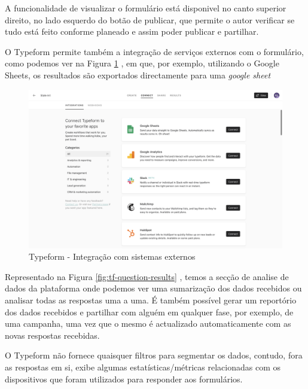 \newpage

A funcionalidade de visualizar o formulário está disponivel no canto superior direito, no lado esquerdo do botão de publicar, que permite o autor verificar se tudo está feito conforme planeado e assim poder publicar e partilhar.

O Typeform permite também a integração de serviços externos com o formulário, como podemos ver na Figura \ref{fig:tf-question-integration} , em que, por exemplo, utilizando o Google Sheets\cite{googlesheets}, os resultados são exportados directamente para uma \textit{google sheet}


\begin{figure}[ht!]
	\begin{center}
		\includegraphics[width=1\textwidth]{img/tf/tf-question-integration}
		\caption{Typeform - Integração com sistemas externos}
		\label{fig:tf-question-integration}
	\end{center}
\end{figure}

Representado na Figura \ref{fig:tf-question-results} , temos a secção de analise de dados da plataforma onde podemos ver uma sumarização dos dados recebidos ou  analisar todas as respostas uma a uma. É também possível gerar um reportório dos dados recebidos e partilhar com alguém em qualquer fase, por exemplo, de uma campanha, uma vez que o mesmo é actualizado automaticamente com as novas respostas recebidas. 

O Typeform não fornece quaisquer filtros para segmentar os dados, contudo, fora as respostas em si, exibe algumas estatísticas/métricas relacionadas com os dispositivos que foram utilizados para responder aos formulários.


